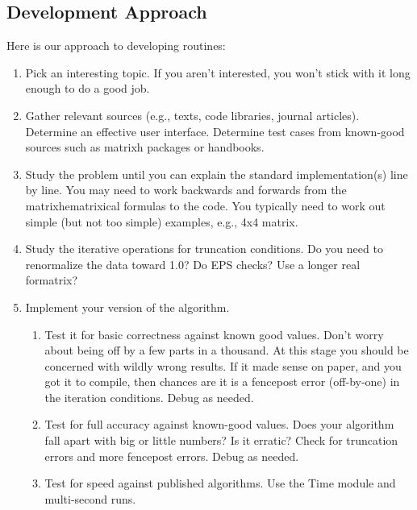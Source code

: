 \subsection{Development Approach}
Here is our approach to developing routines:
\begin{enumerate}
     \item Pick an interesting topic.  If you aren't
     interested, you won't stick with it long enough to do a
     good job.
     
     \item Gather relevant sources (e.g., texts, code
     libraries, journal articles).  Determine an effective
     user interface.  Determine test cases from known-good
     sources such as matrixh packages or handbooks.
     
     \item Study the problem until you can explain the standard
     implementation(s) line by line.  You may need to work
     backwards and forwards from the matrixhematrixical formulas
     to the code.  You typically need to work out simple
     (but not too simple) examples, e.g., 4x4 matrix.
     
     \item Study the iterative operations for truncation
     conditions.  Do you need to renormalize the data toward
     1.0?  Do EPS checks?  Use a longer real formatrix?
     
     \item Implement your version of the algorithm.
     \begin{enumerate}
          \item Test it for basic correctness against known
          good values.  Don't worry about being off by a few
          parts in a thousand.  At this stage you should be
          concerned with wildly wrong results.  If it made
          sense on paper, and you got it to compile, then
          chances are it is a fencepost error (off-by-one)
          in the iteration conditions.  Debug as needed.
          
          \item Test for full accuracy against known-good
          values.  Does your algorithm fall apart with big
          or little numbers?  Is it erratic?  Check for
          truncation errors and more fencepost errors.
          Debug as needed.
          
          \item Test for speed against published algorithms.
          Use the Time module and multi-second runs.
       \end{enumerate}
\end{enumerate}

